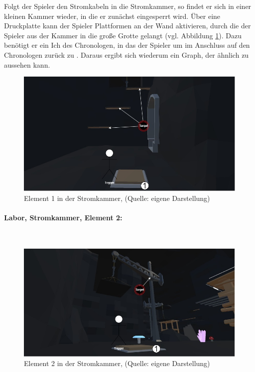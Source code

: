 Folgt der Spieler den Stromkabeln in die Stromkammer, so findet er sich in einer kleinen Kammer wieder, in die er zunächst eingesperrt wird. Über eine Druckplatte kann der Spieler Plattformen an der Wand aktivieren, durch die der Spieler aus der Kammer in die große Grotte gelangt (vgl. Abbildung \ref{fig:L02_R01_R01}).
Dazu benötigt er ein Ich des Chronologen, in das der Spieler  um im Anschluss auf den Chronologen zurück zu  . Daraus ergibt sich wiederum ein Graph, der ähnlich zu  aussehen kann.
\begin{figure}[ht]
\centering
\includegraphics[width=0.8\linewidth]{content/pictures/Raetsel-L02_R01_R01.jpg}
\caption{Element 1 in der Stromkammer, (Quelle: eigene Darstellung)}
\label{fig:L02_R01_R01}
\end{figure}
\paragraph{Labor, Stromkammer, Element 2:}\label{p:lse2}
~

\begin{figure}[ht]
\centering
\includegraphics[width=0.8\linewidth]{content/pictures/Raetsel-L02_R01_R02.jpg}
\caption{Element 2 in der Stromkammer, (Quelle: eigene Darstellung)}
\label{fig:L02_R01_R02}
\end{figure}


